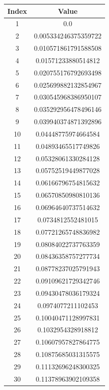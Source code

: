 \documentclass{article}
\begin{document}
\begin{longtable}{|c|c|}
    \hline
    Index & Value \\
    \hline
    1 & 0.0 \\
    \hline
    2 & 0.005334246375359722 \\
    \hline
    3 & 0.010571861791588508 \\
    \hline
    4 & 0.01571233880514812 \\
    \hline
    5 & 0.020755176792693498 \\
    \hline
    6 & 0.025699882132854967 \\
    \hline
    7 & 0.030545968386950107 \\
    \hline
    8 & 0.035292956478496146 \\
    \hline
    9 & 0.039940374871392896 \\
    \hline
    10 & 0.04448775974664584 \\
    \hline
    11 & 0.04893465517749826 \\
    \hline
    12 & 0.05328061330284128 \\
    \hline
    13 & 0.05752519449877028 \\
    \hline
    14 & 0.06166796754815632 \\
    \hline
    15 & 0.06570850980810136 \\
    \hline
    16 & 0.06964640737514632 \\
    \hline
    17 & 0.0734812552481015 \\
    \hline
    18 & 0.07721265748836982 \\
    \hline
    19 & 0.08084022737763359 \\
    \hline
    20 & 0.08436358757277734 \\
    \hline
    21 & 0.08778237025791943 \\
    \hline
    22 & 0.09109621729342746 \\
    \hline
    23 & 0.09430478036179324 \\
    \hline
    24 & 0.0974077211102453 \\
    \hline
    25 & 0.10040471128997831 \\
    \hline
    26 & 0.1032954328918812 \\
    \hline
    27 & 0.10607957827864775 \\
    \hline
    28 & 0.10875685031315575 \\
    \hline
    29 & 0.11132696248300325 \\
    \hline
    30 & 0.11378963902109358 \\

\end{longtable}
\end{document}

